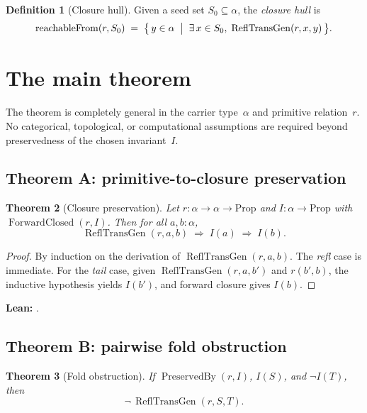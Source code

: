 \documentclass[11pt]{article}
\theoremstyle{plain}
\newtheorem{theorem}{Theorem}[section]
\theoremstyle{definition}
\newtheorem{definition}[theorem]{Definition}
\theoremstyle{remark}
\newcommand{\ReflTransGen}{\operatorname{ReflTransGen}}
\newcommand{\PreservedBy}{\operatorname{PreservedBy}}
\newcommand{\ForwardClosed}{\operatorname{ForwardClosed}}
\newcommand{\reachableFrom}{\operatorname{reachableFrom}}
\begin{document}
\begin{definition}[Closure hull]\label{def:hull}
Given a seed set $S_0 \subseteq \alpha$, the \emph{closure hull} is
\[
  \reachableFrom(r, S_0) \;=\;
  \bigl\{\, y \in \alpha \;\bigm|\;
  \exists\, x \in S_0,\; \ReflTransGen(r,x,y) \,\bigr\}.
\]
\end{definition}

\section{The main theorem}\label{sec:main}

The theorem is completely general in the carrier type~$\alpha$ and primitive
relation~$r$.  No categorical, topological, or computational assumptions are required
beyond preservedness of the chosen invariant~$I$.

\subsection*{Theorem A: primitive-to-closure preservation}

\begin{theorem}[Closure preservation]\label{thm:closure-preservation}
Let $r : \alpha \to \alpha \to \mathrm{Prop}$ and $I : \alpha \to \mathrm{Prop}$ with
$\ForwardClosed(r,I)$.  Then for all $a,b : \alpha$,
\[
  \ReflTransGen(r,a,b) \;\Longrightarrow\; I(a) \;\Longrightarrow\; I(b).
\]
\end{theorem}

\begin{proof}
By induction on the derivation of $\ReflTransGen(r,a,b)$.  The \emph{refl} case is
immediate.  For the \emph{tail} case, given $\ReflTransGen(r,a,b')$ and $r(b',b)$, the
inductive hypothesis yields $I(b')$, and forward closure gives $I(b)$.
\end{proof}

\smallskip
\noindent\textbf{Lean:}
.

\subsection*{Theorem B: pairwise fold obstruction}

\begin{theorem}[Fold obstruction]\label{thm:fold-obstruction}
If $\PreservedBy(r,I)$, $I(S)$, and $\lnot I(T)$, then
\[
  \lnot\, \ReflTransGen(r, S, T).
\]
\end{theorem}
\end{document}
